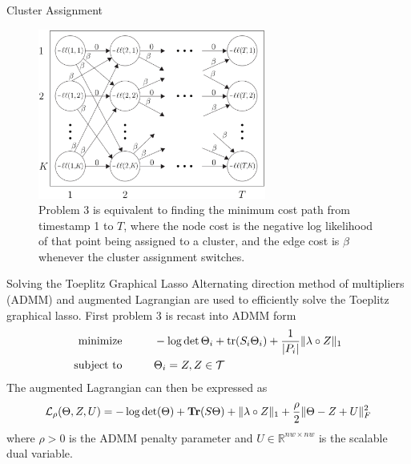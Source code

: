 \documentclass{beamer}
\DeclarePairedDelimiter \norm{\lVert}{\rVert}%
\DeclarePairedDelimiter \abs{\lvert}{\rvert}%
\begin{document}

\begin{frame}{Cluster Assignment}
	\begin{figure}
		\centering
		\includegraphics[width=7.5cm]{fig7.eps}
		\caption*{\centering Problem 3 is equivalent to finding the minimum cost path from timestamp 1 to $T$, where the node cost is the negative log likelihood of that point being assigned to a cluster, and the edge cost is $\beta$ whenever the cluster assignment switches.}
	\end{figure}
\end{frame}


\begin{frame}{Solving the Toeplitz Graphical Lasso}
	Alternating direction method of multipliers (ADMM) and augmented Lagrangian are used to efficiently solve the Toeplitz graphical lasso. First problem 3 is recast into ADMM form
	\begin{align*}
		\text{minimize} \hspace{1cm} & -\log\det\Theta_i + \text{tr}(S_i\Theta_i) + \frac{1}{\abs{P_i}}\norm{\lambda \circ Z}_1 \\
		\text{subject to} \hspace{1cm} & \Theta_i = Z, Z \in \mathcal{T} 
	\end{align*}
	The augmented Lagrangian can then be expressed as
	\begin{align*}
		\mathcal{L}_\rho(\Theta, Z, U) = -\log\det(\Theta) + \textbf{Tr}(S\Theta) + \norm{\lambda \circ Z}_1 + \frac{\rho}{2}\norm{\Theta - Z + U}_F^2
	\end{align*}
	where $\rho > 0$ is the ADMM penalty parameter and $U \in \mathbb{R}^{nw \times nw}$ is the scalable dual variable. 
\end{frame} 
\end{document}
